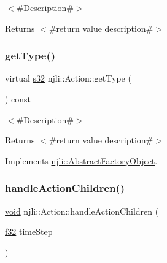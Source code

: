 $<$\#\+Description\#$>$

\begin{DoxyReturn}{Returns}
$<$\#return value description\#$>$ 
\end{DoxyReturn}
\mbox{\label{classnjli_1_1_action_a16970f3b547f326476ffd6d0d1feb3bf}} 
\subsubsection{\texorpdfstring{get\+Type()}{getType()}}
{\footnotesize\ttfamily virtual \mbox{\hyperlink{_util_8h_aa62c75d314a0d1f37f79c4b73b2292e2}{s32}} njli\+::\+Action\+::get\+Type (\begin{DoxyParamCaption}{ }\end{DoxyParamCaption}) const\hspace{0.3cm}{\ttfamily [virtual]}}

$<$\#\+Description\#$>$

\begin{DoxyReturn}{Returns}
$<$\#return value description\#$>$ 
\end{DoxyReturn}


Implements \mbox{\hyperlink{classnjli_1_1_abstract_factory_object_a207c86146d40d0794708ae7f2d4e60a7}{njli\+::\+Abstract\+Factory\+Object}}.

\mbox{\label{classnjli_1_1_action_ab787c5769b5be7861a921ee20aa6c9b7}} 
\subsubsection{\texorpdfstring{handle\+Action\+Children()}{handleActionChildren()}}
{\footnotesize\ttfamily \mbox{\hyperlink{_thread_8h_af1e856da2e658414cb2456cb6f7ebc66}{void}} njli\+::\+Action\+::handle\+Action\+Children (\begin{DoxyParamCaption}\item[{\mbox{\hyperlink{_util_8h_a5f6906312a689f27d70e9d086649d3fd}{f32}}}]{time\+Step }\end{DoxyParamCaption})\hspace{0.3cm}{\ttfamily [protected]}}

